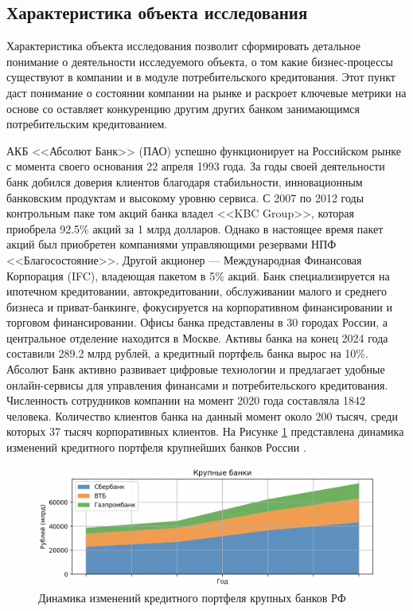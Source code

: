 \documentclass[14pt, a4paper]{extarticle}
\begin{document}
\subsection{Характеристика объекта исследования}

Характеристика объекта исследования позволит сформировать детальное понимание о
деятельности исследуемого объекта, о том какие бизнес-процессы существуют в
компании и в модуле потребительского кредитования. Этот пункт даст понимание о
состоянии компании на рынке и раскроет ключевые метрики на основе со
оставляет конкуренцию другим других банком занимающимся потребительским
кредитованием.

АКБ <<Абсолют Банк>> (ПАО) успешно функционирует на Российском рынке с момента
своего основания 22 апреля 1993 года. За годы своей деятельности банк добился
доверия клиентов благодаря стабильности, инновационным банковским продуктам и
высокому уровню сервиса. С 2007 по 2012 годы контрольным паке том акций банка
владел <<KBC Group>>, которая приобрела 92.5\% акций за 1 млрд долларов. Однако
в настоящее время пакет акций был приобретен компаниями управляющими резервами
НПФ <<Благосостояние>>. Другой акционер — Международная Финансовая Корпорация
(IFC), владеющая пакетом в 5\% акций. Банк специализируется на ипотечном
кредитовании, автокредитовании, обслуживании малого и среднего бизнеса и
приват-банкинге, фокусируется на корпоративном финансировании и торговом
финансировании. Офисы банка представлены в 30 городах России, а центральное
отделение находится в Москве. Активы банка на конец 2024 года составили 289.2
млрд рублей, а кредитный портфель банка вырос на 10\%. Абсолют Банк активно
развивает цифровые технологии и предлагает удобные онлайн-сервисы для
управления финансами и потребительского кредитования. Численность сотрудников
компании на момент 2020 года составляла 1842 человека. Количество клиентов
банка на данный момент около 200 тысяч, среди которых 37 тысяч корпоративных
клиентов. На Рисунке \ref{fig:кредитный_портфель_банков_крупные} представлена
динамика изменений кредитного портфеля крупнейших банков России
\cite{banks-rating}.

\begin{figure}[H]
	\centering
	\includegraphics[width=\textwidth]{кредитный_портфель_банков_крупные}
	\caption{Динамика изменений кредитного портфеля крупных банков РФ}
	\label{fig:кредитный_портфель_банков_крупные}
\end{figure}
\end{document}
